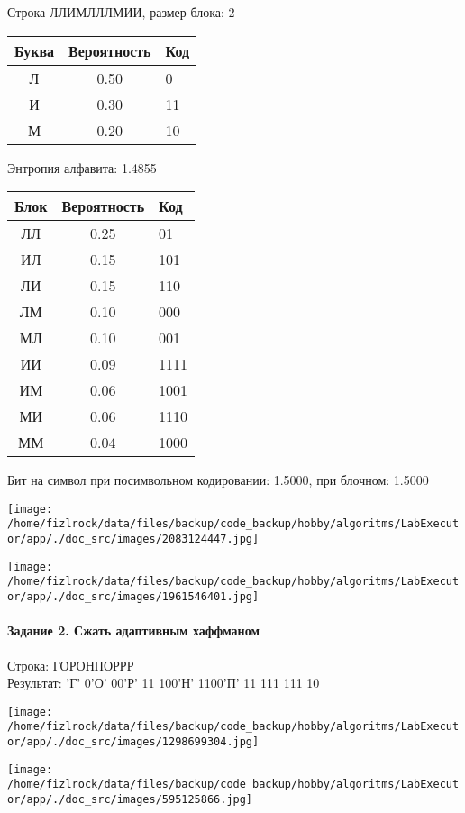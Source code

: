 \documentclass[a4paper, 12pt]{article}
\begin{document}
Строка ЛЛИМЛЛЛМИИ, размер блока: 2
\begin{center}
 \begin{tabular}{ |c|c|l| } 
  \hline
     Буква & Вероятность & Код\\ \hline
Л & 0.50 & 0\\\hline
И & 0.30 & 11\\\hline
М & 0.20 & 10
\\ \hline \end{tabular}
\end{center}
Энтропия алфавита: 1.4855
\begin{center}
 \begin{tabular}{ |c|c|l| } 
  \hline
     Блок & Вероятность & Код\\ \hline
ЛЛ & 0.25 & 01\\\hline
ИЛ & 0.15 & 101\\\hline
ЛИ & 0.15 & 110\\\hline
ЛМ & 0.10 & 000\\\hline
МЛ & 0.10 & 001\\\hline
ИИ & 0.09 & 1111\\\hline
ИМ & 0.06 & 1001\\\hline
МИ & 0.06 & 1110\\\hline
ММ & 0.04 & 1000
\\ \hline \end{tabular}
\end{center}
Бит на символ при посимвольном кодировании: 1.5000, при блочном: 1.5000

\texttt{[image: /home/fizlrock/data/files/backup/code\_backup/hobby/algoritms/LabExecutor/app/./doc\_src/images/2083124447.jpg]}

\texttt{[image: /home/fizlrock/data/files/backup/code\_backup/hobby/algoritms/LabExecutor/app/./doc\_src/images/1961546401.jpg]}
\pagebreak
\paragraph{Задание 2. Сжать адаптивным хаффманом\\}

Строка: 
ГОРОНПОРРР\\
Результат: 'Г' 0'О' 00'Р' 11 100'Н' 1100'П' 11 111 111 10

\texttt{[image: /home/fizlrock/data/files/backup/code\_backup/hobby/algoritms/LabExecutor/app/./doc\_src/images/1298699304.jpg]}

\texttt{[image: /home/fizlrock/data/files/backup/code\_backup/hobby/algoritms/LabExecutor/app/./doc\_src/images/595125866.jpg]}
\end{document}
